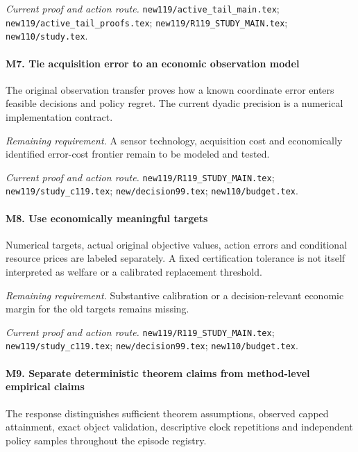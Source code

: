 \par\emph{Current proof and action route.} \nolinkurl{new119/active_tail_main.tex}; \nolinkurl{new119/active_tail_proofs.tex}; \nolinkurl{new119/R119_STUDY_MAIN.tex}; \nolinkurl{new110/study.tex}.

\paragraph{M7. Tie acquisition error to an economic observation model}

The original observation transfer proves how a known coordinate error enters feasible decisions and policy regret. The current dyadic precision is a numerical implementation contract.

\par\emph{Remaining requirement.} A sensor technology, acquisition cost and economically identified error-cost frontier remain to be modeled and tested.

\par\emph{Current proof and action route.} \nolinkurl{new119/R119_STUDY_MAIN.tex}; \nolinkurl{new119/study_c119.tex}; \nolinkurl{new/decision99.tex}; \nolinkurl{new110/budget.tex}.

\paragraph{M8. Use economically meaningful targets}

Numerical targets, actual original objective values, action errors and conditional resource prices are labeled separately. A fixed certification tolerance is not itself interpreted as welfare or a calibrated replacement threshold.

\par\emph{Remaining requirement.} Substantive calibration or a decision-relevant economic margin for the old targets remains missing.

\par\emph{Current proof and action route.} \nolinkurl{new119/R119_STUDY_MAIN.tex}; \nolinkurl{new119/study_c119.tex}; \nolinkurl{new/decision99.tex}; \nolinkurl{new110/budget.tex}.

\paragraph{M9. Separate deterministic theorem claims from method-level empirical claims}

The response distinguishes sufficient theorem assumptions, observed capped attainment, exact object validation, descriptive clock repetitions and independent policy samples throughout the episode registry.


